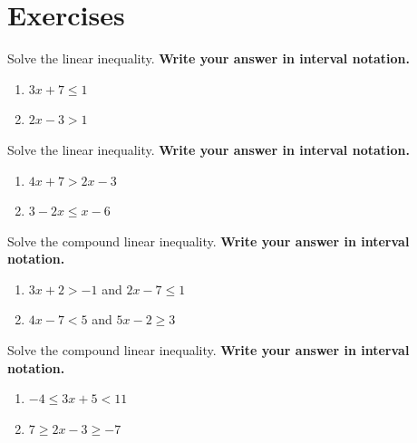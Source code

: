 \documentclass[en,11pt]{latex/elegantbookr}
\providecommand{\tightlist}{%
  \setlength{\itemsep}{0pt}\setlength{\parskip}{0pt}}
\theoremstyle{definition}
\theoremstyle{definition}
\theoremstyle{definition}
\theoremstyle{remark}
\let\BeginKnitrBlock\begin \let\EndKnitrBlock\end
\begin{document}
\hypertarget{exercises}{%
\section{Exercises}\label{exercises}}

\BeginKnitrBlock{exercise}
\protect\hypertarget{exr:unnamed-chunk-21}{}{\label{exr:unnamed-chunk-21} }Solve the linear inequality. \textbf{Write your answer in interval notation.}

\begin{enumerate}
\def\labelenumi{\arabic{enumi}.}
\tightlist
\item
  \(3x + 7 \leq 1\)
\item
  \(2x-3>1\)
\end{enumerate}
\EndKnitrBlock{exercise}

\BeginKnitrBlock{exercise}
\protect\hypertarget{exr:unnamed-chunk-22}{}{\label{exr:unnamed-chunk-22} }Solve the linear inequality. \textbf{Write your answer in interval notation.}

\begin{enumerate}
\def\labelenumi{\arabic{enumi}.}
\tightlist
\item
  \(4x + 7 > 2x-3\)
\item
  \(3-2x \le x-6\)
\end{enumerate}
\EndKnitrBlock{exercise}

\BeginKnitrBlock{exercise}
\protect\hypertarget{exr:unnamed-chunk-23}{}{\label{exr:unnamed-chunk-23} }Solve the compound linear inequality. \textbf{Write your answer in interval notation.}

\begin{enumerate}
\def\labelenumi{\arabic{enumi}.}
\tightlist
\item
  \(3x+2>-1\) and \(2x-7\leq 1\)
\item
  \(4x -7< 5\) and \(5x-2\geq 3\)
\end{enumerate}
\EndKnitrBlock{exercise}

\BeginKnitrBlock{exercise}
\protect\hypertarget{exr:unnamed-chunk-24}{}{\label{exr:unnamed-chunk-24} }Solve the compound linear inequality. \textbf{Write your answer in interval notation.}

\begin{enumerate}
\def\labelenumi{\arabic{enumi}.}
\tightlist
\item
  \(-4\leq 3x+5<11\)
\item
  \(7\geq 2x-3\geq -7\)
\end{enumerate}
\EndKnitrBlock{exercise}
\end{document}
